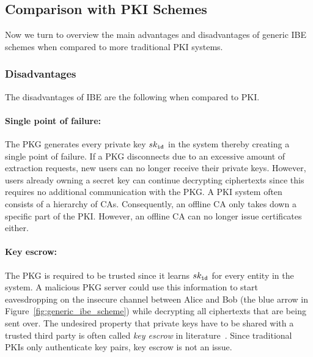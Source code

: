 \subsection{Comparison with PKI Schemes}
\label{sec:pros_and_cons_of_ibe}
Now we turn to overview the main advantages and disadvantages of generic IBE schemes when compared to more traditional PKI systems.

\subsubsection{Disadvantages}
The disadvantages of IBE are the following when compared to PKI.
\paragraph{Single point of failure:}
The PKG generates every private key $sk_{\mathtt{id}_{}}$ in the system thereby creating a single point of failure. If a PKG disconnects due to an excessive amount of extraction requests, new users can no longer receive their private keys. However, users already owning a secret key can continue decrypting ciphertexts since this requires no additional communication with the PKG. A PKI system often consists of a hierarchy of CAs. Consequently, an offline CA only takes down a specific part of the PKI. However, an offline CA can no longer issue certificates either.

\paragraph{Key escrow:}
The PKG is required to be trusted since it learns $sk_{\mathtt{id}_{}}$ for every entity in the system. A malicious PKG server could use this information to start eavesdropping on the insecure channel between Alice and Bob (the blue arrow in Figure~\ref{fig:generic_ibe_scheme}) while decrypting all ciphertexts that are being sent over. The undesired property that private keys have to be shared with a trusted third party is often called \textit{key escrow} in literature~\cite{art:AbelsonHARBMBJBMDWGJNGRLSISB97}. Since traditional PKIs only authenticate key pairs, key escrow is not an issue.

